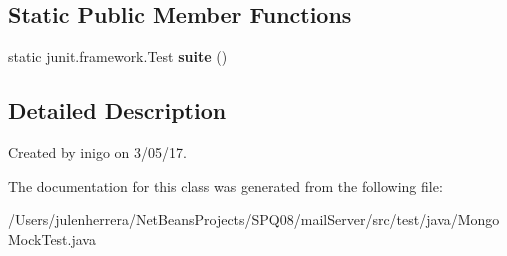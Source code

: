 \subsection*{Static Public Member Functions}
\begin{DoxyCompactItemize}
\item 
\mbox{\label{class_mongo_mock_test_aca8d2f293367a5afd3ec695454a2cb5b}} 
static junit.\+framework.\+Test {\bfseries suite} ()
\end{DoxyCompactItemize}


\subsection{Detailed Description}
Created by inigo on 3/05/17. 

The documentation for this class was generated from the following file\+:\begin{DoxyCompactItemize}
\item 
/\+Users/julenherrera/\+Net\+Beans\+Projects/\+S\+P\+Q08/mail\+Server/src/test/java/Mongo\+Mock\+Test.\+java\end{DoxyCompactItemize}
